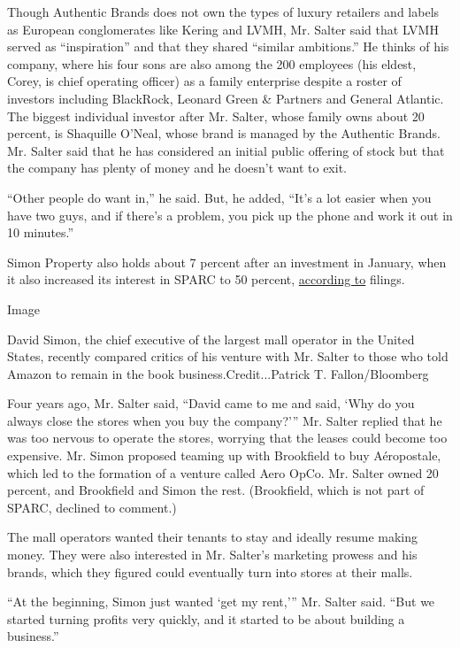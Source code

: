 Though Authentic Brands does not own the types of luxury retailers and
labels as European conglomerates like Kering and LVMH, Mr. Salter said
that LVMH served as ``inspiration'' and that they shared ``similar
ambitions.'' He thinks of his company, where his four sons are also
among the 200 employees (his eldest, Corey, is chief operating officer)
as a family enterprise despite a roster of investors including
BlackRock, Leonard Green \& Partners and General Atlantic. The biggest
individual investor after Mr. Salter, whose family owns about 20
percent, is Shaquille O'Neal, whose brand is managed by the Authentic
Brands. Mr. Salter said that he has considered an initial public
offering of stock but that the company has plenty of money and he
doesn't want to exit.

``Other people do want in,'' he said. But, he added, ``It's a lot easier
when you have two guys, and if there's a problem, you pick up the phone
and work it out in 10 minutes.''

Simon Property also holds about 7 percent after an investment in
January, when it also increased its interest in SPARC to 50 percent,
\href{https://investors.simon.com/node/24506/html}{according to}
filings.

Image

David Simon, the chief executive of the largest mall operator in the
United States, recently compared critics of his venture with Mr. Salter
to those who told Amazon to remain in the book business.Credit...Patrick
T. Fallon/Bloomberg

Four years ago, Mr. Salter said, ``David came to me and said, `Why do
you always close the stores when you buy the company?''' Mr. Salter
replied that he was too nervous to operate the stores, worrying that the
leases could become too expensive. Mr. Simon proposed teaming up with
Brookfield to buy Aéropostale, which led to the formation of a venture
called Aero OpCo. Mr. Salter owned 20 percent, and Brookfield and Simon
the rest. (Brookfield, which is not part of SPARC, declined to comment.)

The mall operators wanted their tenants to stay and ideally resume
making money. They were also interested in Mr. Salter's marketing
prowess and his brands, which they figured could eventually turn into
stores at their malls.

``At the beginning, Simon just wanted `get my rent,''' Mr. Salter said.
``But we started turning profits very quickly, and it started to be
about building a business.''

